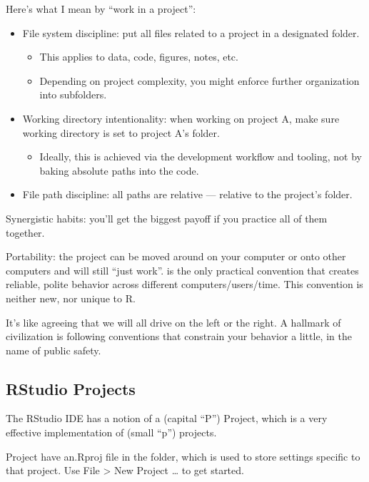 \documentclass[
  letterpaper,
  DIV=11,
  numbers=noendperiod]{scrreprt}
\providecommand{\tightlist}{%
  \setlength{\itemsep}{0pt}\setlength{\parskip}{0pt}}
\begin{document}
Here's what I mean by ``work in a project'':

\begin{itemize}
\tightlist
\item
  File system discipline: put all files related to a project in a
  designated folder.

  \begin{itemize}
  \tightlist
  \item
    This applies to data, code, figures, notes, etc.
  \item
    Depending on project complexity, you might enforce further
    organization into subfolders.
  \end{itemize}
\item
  Working directory intentionality: when working on project A, make sure
  working directory is set to project A's folder.

  \begin{itemize}
  \tightlist
  \item
    Ideally, this is achieved via the development workflow and tooling,
    not by baking absolute paths into the code.
  \end{itemize}
\item
  File path discipline: all paths are relative --- relative to the
  project's folder.
\end{itemize}

Synergistic habits: you'll get the biggest payoff if you practice all of
them together.

Portability: the project can be moved around on your computer or onto
other computers and will still ``just work''. is the only practical
convention that creates reliable, polite behavior across different
computers/users/time. This convention is neither new, nor unique to R.

It's like agreeing that we will all drive on the left or the right. A
hallmark of civilization is following conventions that constrain your
behavior a little, in the name of public safety.

\hypertarget{rstudio-projects}{%
\subsection{RStudio Projects}\label{rstudio-projects}}

The RStudio IDE has a notion of a (capital ``P'') Project, which is a
very effective implementation of (small ``p'') projects.

Project have an.Rproj file in the folder, which is used to store
settings specific to that project. Use File \textgreater{} New Project
\ldots{} to get started.
\end{document}
